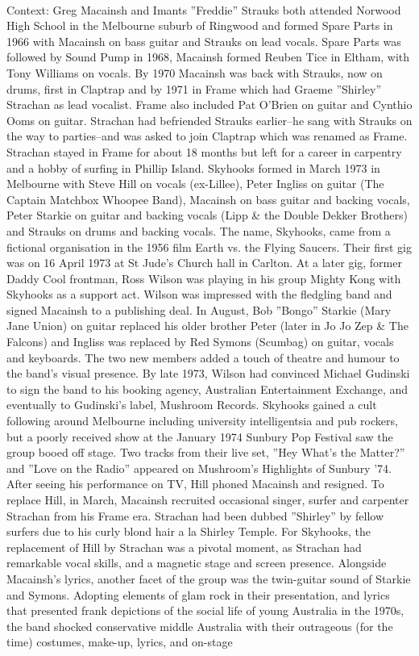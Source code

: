 \documentclass[11pt,a4paper, onecolumn]{article}
\begin{document}
\\ Context: Greg Macainsh and Imants ''Freddie'' Strauks both attended Norwood High School in the Melbourne suburb of Ringwood and formed Spare Parts in 1966 with Macainsh on bass guitar and Strauks on lead vocals. Spare Parts was followed by Sound Pump in 1968, Macainsh formed Reuben Tice in Eltham, with Tony Williams on vocals. By 1970 Macainsh was back with Strauks, now on drums, first in Claptrap and by 1971 in Frame which had Graeme ''Shirley'' Strachan as lead vocalist. Frame also included Pat O'Brien on guitar and Cynthio Ooms on guitar. Strachan had befriended Strauks earlier--he sang with Strauks on the way to parties--and was asked to join Claptrap which was renamed as Frame. Strachan stayed in Frame for about 18 months but left for a career in carpentry and a hobby of surfing in Phillip Island. Skyhooks formed in March 1973 in Melbourne with Steve Hill on vocals (ex-Lillee), Peter Ingliss on guitar (The Captain Matchbox Whoopee Band), Macainsh on bass guitar and backing vocals, Peter Starkie on guitar and backing vocals (Lipp & the Double Dekker Brothers) and Strauks on drums and backing vocals. The name, Skyhooks, came from a fictional organisation in the 1956 film Earth vs. the Flying Saucers. Their first gig was on 16 April 1973 at St Jude's Church hall in Carlton. At a later gig, former Daddy Cool frontman, Ross Wilson was playing in his group Mighty Kong with Skyhooks as a support act. Wilson was impressed with the fledgling band and signed Macainsh to a publishing deal. In August, Bob ''Bongo'' Starkie (Mary Jane Union) on guitar replaced his older brother Peter (later in Jo Jo Zep & The Falcons) and Ingliss was replaced by Red Symons (Scumbag) on guitar, vocals and keyboards. The two new members added a touch of theatre and humour to the band's visual presence. By late 1973, Wilson had convinced Michael Gudinski to sign the band to his booking agency, Australian Entertainment Exchange, and eventually to Gudinski's label, Mushroom Records. Skyhooks gained a cult following around Melbourne including university intelligentsia and pub rockers, but a poorly received show at the January 1974 Sunbury Pop Festival saw the group booed off stage. Two tracks from their live set, ''Hey What's the Matter?'' and ''Love on the Radio'' appeared on Mushroom's Highlights of Sunbury '74. After seeing his performance on TV, Hill phoned Macainsh and resigned. To replace Hill, in March, Macainsh recruited occasional singer, surfer and carpenter Strachan from his Frame era. Strachan had been dubbed ''Shirley'' by fellow surfers due to his curly blond hair a la Shirley Temple. For Skyhooks, the replacement of Hill by Strachan was a pivotal moment, as Strachan had remarkable vocal skills, and a magnetic stage and screen presence. Alongside Macainsh's lyrics, another facet of the group was the twin-guitar sound of Starkie and Symons. Adopting elements of glam rock in their presentation, and lyrics that presented frank depictions of the social life of young Australia in the 1970s, the band shocked conservative middle Australia with their outrageous (for the time) costumes, make-up, lyrics, and on-stage 
\end{document}
